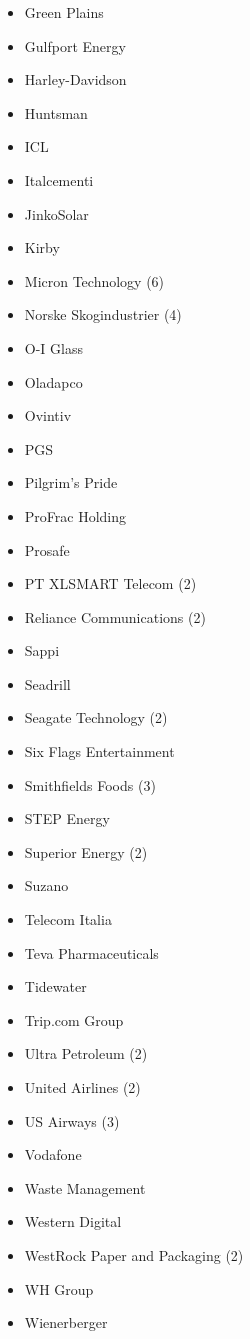 \begin{itemize}
    \item Green Plains
    \item Gulfport Energy
    \item Harley-Davidson
    \item Huntsman
    \item ICL
    \item Italcementi
    \item JinkoSolar
    \item Kirby
    \item Micron Technology (6)
    \item Norske Skogindustrier (4)
    \item O-I Glass
    \item Oladapco
    \item Ovintiv
    \item PGS
    \item Pilgrim’s Pride
    \item ProFrac Holding
    \item Prosafe
    \item PT XLSMART Telecom (2)
    \item Reliance Communications (2)
    \item Sappi
    \item Seadrill
    \item Seagate Technology (2)
    \item Six Flags Entertainment
    \item Smithfields Foods (3)
    \item STEP Energy
    \item Superior Energy (2)
    \item Suzano
    \item Telecom Italia
    \item Teva Pharmaceuticals
    \item Tidewater
    \item Trip.com Group
    \item Ultra Petroleum (2)
    \item United Airlines (2)
    \item US Airways (3)
    \item Vodafone
    \item Waste Management
    \item Western Digital
    \item WestRock Paper and Packaging (2)
    \item WH Group
    \item Wienerberger
\end{itemize}

